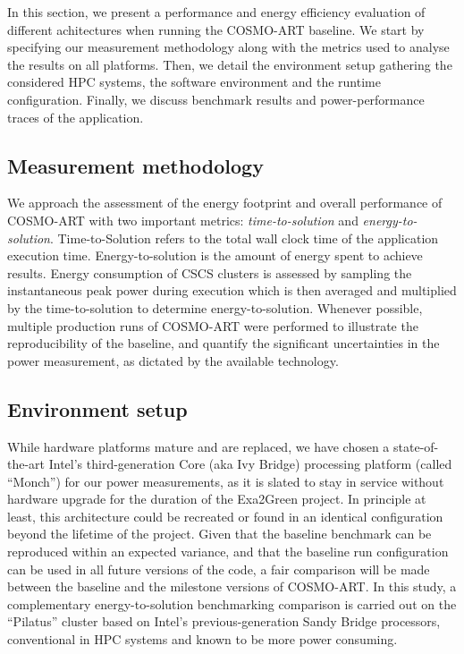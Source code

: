 In  this  section, we  present  a  performance  and energy  efficiency
evaluation  of  different  achitectures  when  running  the  COSMO-ART
baseline.  We  start by  specifying our measurement  methodology along
with the metrics used to  analyse the results on all platforms.  Then,
we detail the environment  setup gathering the considered HPC systems,
the software  environment and the runtime  configuration.  Finally, we
discuss  benchmark   results  and  power-performance   traces  of  the
application.

\subsection{Measurement methodology}
\label{subsec:4.1}
We  approach  the  assessment  of  the energy  footprint  and  overall
performance    of    COSMO-ART    with    two    important    metrics:
\textit{time-to-solution}       and       \textit{energy-to-solution}.
Time-to-Solution  refers   to  the  total  wall  clock   time  of  the
application execution time. Energy-to-solution is the amount of energy
spent  to achieve  results.  Energy  consumption of  CSCS  clusters is
assessed  by sampling  the instantaneous  peak power  during execution
which  is then  averaged  and multiplied  by  the time-to-solution  to
determine energy-to-solution.   Whenever possible, multiple production
runs of COSMO-ART were  performed to illustrate the reproducibility of
the baseline, and quantify  the significant uncertainties in the power
measurement, as dictated by the available technology.

\subsection{Environment setup}
\label{subsec:4.2}
While hardware  platforms mature  and are replaced,  we have  chosen a
state-of-the-art  Intel's  third-generation   Core  (aka  Ivy  Bridge)
processing platform (called ``Monch'')  for our power measurements, as
it  is slated  to stay  in service  without hardware  upgrade  for the
duration  of  the Exa2Green  project.   In  principle  at least,  this
architecture could be recreated or found in an identical configuration
beyond the lifetime of the project.  Given that the baseline benchmark
can be reproduced  within an expected variance, and  that the baseline
run configuration  can be used in  all future versions of  the code, a
fair comparison  will be made  between the baseline and  the milestone
versions   of    COSMO-ART.    In   this    study,   a   complementary
energy-to-solution  benchmarking  comparison  is  carried out  on  the
``Pilatus'' cluster based  on Intel's previous-generation Sandy Bridge
processors, conventional  in HPC  systems and known  to be  more power
consuming.

